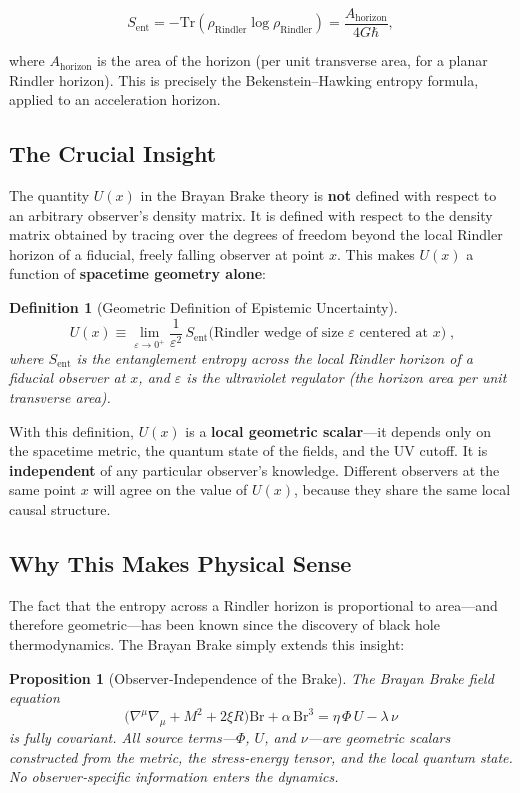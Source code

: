 \documentclass[11pt]{article}
\newtheorem{proposition}[theorem]{Proposition}
\newtheorem{definition}[theorem]{Definition}
\begin{document}
\[
S_{\text{ent}} = -\mathrm{Tr}(\rho_{\text{Rindler}}\log\rho_{\text{Rindler}}) = \frac{A_{\text{horizon}}}{4G\hbar},
\]

where \(A_{\text{horizon}}\) is the area of the horizon (per unit transverse area, for a planar Rindler horizon). This is precisely the Bekenstein–Hawking entropy formula, applied to an acceleration horizon.

\subsection{The Crucial Insight}

The quantity \(U(x)\) in the Brayan Brake theory is \textbf{not} defined with respect to an arbitrary observer's density matrix. It is defined with respect to the density matrix obtained by tracing over the degrees of freedom beyond the local Rindler horizon of a fiducial, freely falling observer at point \(x\). This makes \(U(x)\) a function of \textbf{spacetime geometry alone}:

\begin{definition}[Geometric Definition of Epistemic Uncertainty]\label{def:U_geometric}
\[
\boxed{\;U(x) \equiv \lim_{\varepsilon\to 0^+} \frac{1}{\varepsilon^2}\,
S_{\mathrm{ent}}\bigl(\text{Rindler wedge of size }\varepsilon\text{ centered at }x\bigr)\;},
\]
where \(S_{\mathrm{ent}}\) is the entanglement entropy across the local Rindler horizon of a fiducial observer at \(x\), and \(\varepsilon\) is the ultraviolet regulator (the horizon area per unit transverse area).
\end{definition}

With this definition, \(U(x)\) is a \textbf{local geometric scalar}—it depends only on the spacetime metric, the quantum state of the fields, and the UV cutoff. It is \textbf{independent} of any particular observer's knowledge. Different observers at the same point \(x\) will agree on the value of \(U(x)\), because they share the same local causal structure.

\subsection{Why This Makes Physical Sense}

The fact that the entropy across a Rindler horizon is proportional to area—and therefore geometric—has been known since the discovery of black hole thermodynamics. The Brayan Brake simply extends this insight:

\begin{proposition}[Observer‑Independence of the Brake]\label{prop:covariance}
The Brayan Brake field equation
\[
\bigl(\nabla^\mu\nabla_\mu + M^2 + 2\xi R\bigr)\mathrm{Br} + \alpha\,\mathrm{Br}^3 = \eta\,\Phi\,U - \lambda\,\nu
\]
is fully covariant. All source terms—\(\Phi\), \(U\), and \(\nu\)—are geometric scalars constructed from the metric, the stress‑energy tensor, and the local quantum state. No observer‑specific information enters the dynamics.
\end{proposition}
\end{document}
